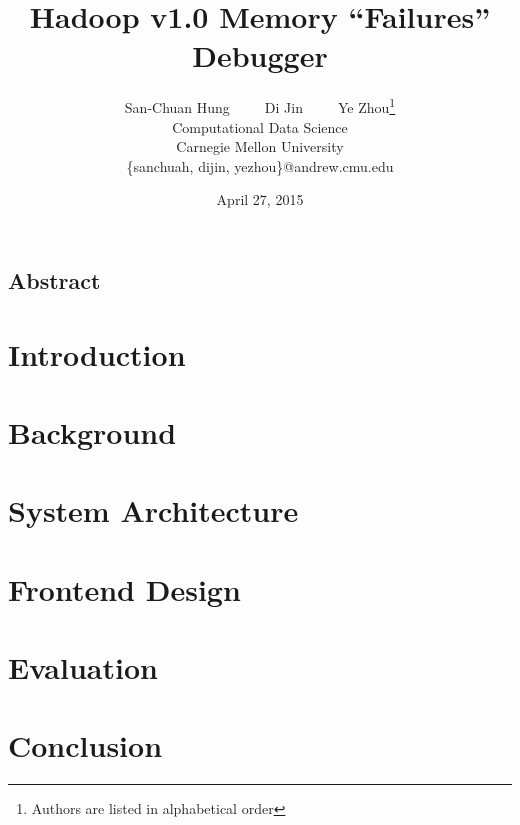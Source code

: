 \documentclass[letterpaper,twocolumn,10pt]{article}
\begin{document}
\date{April 27, 2015}

\title{\Large \bf Hadoop v1.0 Memory “Failures” Debugger}

\author{
{\rm San-Chuan Hung}~~~~~{\rm Di Jin}~~~~~{\rm Ye Zhou}\thanks{Authors are listed in alphabetical order}\\
Computational Data Science\\
Carnegie Mellon University\\
\{sanchuah, dijin, yezhou\}@andrew.cmu.edu\\
} %

\maketitle

\thispagestyle{empty}


\subsection*{Abstract}
\label{sec:dl}


\section{Introduction}


\section{Background}


\section{System Architecture}


\section{Frontend Design}


\section{Evaluation}


\section{Conclusion}




\end{document}

